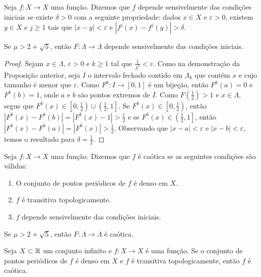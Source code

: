 \begin{definition}
Seja $f: X \to X$ uma função. Dizemos que $f$ depende sensivelmente das condições iniciais se existe $\delta > 0$ com a seguinte propriedade: dados $x \in X$ e $\varepsilon > 0$, existem $y \in X$ e $j \geq 1$ tais que $|x - y| < \varepsilon$ e $|f^j(x) - f^j(y)| > \delta$.
\end{definition}

\begin{proposition}
\label{proposicao caos 3}
Se $\mu > 2 + \sqrt{5}$, então $F: \Lambda \to \Lambda$ depende sensivelmente das condições iniciais.
\end{proposition}

\begin{proof}
Sejam $x \in \Lambda$, $\varepsilon > 0$ e $k \geq 1$ tal que $\frac{1}{\lambda^k} < \varepsilon$. Como na demonstração da Proposição anterior, seja $I$ o intervalo fechado contido em $\Lambda_k$ que contém $x$ e cujo tamanho é menor que $\varepsilon$. Como $F^k: I \to [0, 1]$ é um bijeção, então $F^k(a) = 0$ e  $F^k(b) = 1$, onde $a$ e $b$ são pontos extremos de $I$. Como $F(\frac{1}{2}) > 1$ e $x \in \Lambda$, segue que $F^{k}(x) \in \left[0, \frac{1}{2}\right) \cup \left(\frac{1}{2}, 1\right]$. Se $F^{k}(x) \in \left[0, \frac{1}{2}\right)$, então $|F^k(x) - F^k(b)| = |F^k(x) - 1| > \frac{1}{2}$ e se $F^{k}(x) \in \left(\frac{1}{2}, 1\right]$, então $|F^k(x) - F^k(a)| = |F^k(x)| > \frac{1}{2}$. Observando que $|x - a| < \varepsilon$ e  $|x - b| < \varepsilon$, temos o resultado para $\delta = \frac{1}{2}$. 
\end{proof}

\begin{definition}
Seja $f: X \to X$ uma função. Dizemos que $f$ é caótica se as seguintes condições são válidas:
\begin{enumerate}[label=\roman*.]
\item O conjunto de pontos periódicos de $f$ é denso em $X$.
\item $f$ é transitiva topologicamente.
\item $f$ depende sensivelmente das condições iniciais.
\end{enumerate}
\end{definition}

\begin{theorem} \label{teorema caos 1}
Se $\mu > 2 + \sqrt{5}$, então $F: \Lambda \to \Lambda$ é caótica.
\end{theorem}

\begin{theorem} \label{teorema caos 2}
Seja $X \subset \mathbb{R}$ um conjunto infinito e $f: X \to X$ é uma função. Se o conjunto de pontos periódicos de $f$ é denso em $X$ e $f$ é transitiva topologicamente, então $f$ é caótica.
\end{theorem}
